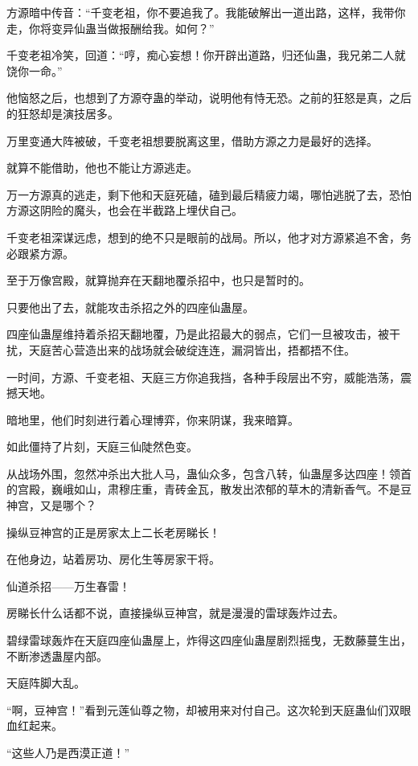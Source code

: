 
\begin{this_body}

方源暗中传音：“千变老祖，你不要追我了。我能破解出一道出路，这样，我带你走，你将变异仙蛊当做报酬给我。如何？”

千变老祖冷笑，回道：“哼，痴心妄想！你开辟出道路，归还仙蛊，我兄弟二人就饶你一命。”

他恼怒之后，也想到了方源夺蛊的举动，说明他有恃无恐。之前的狂怒是真，之后的狂怒却是演技居多。

万里变通大阵被破，千变老祖想要脱离这里，借助方源之力是最好的选择。

就算不能借助，他也不能让方源逃走。

万一方源真的逃走，剩下他和天庭死磕，磕到最后精疲力竭，哪怕逃脱了去，恐怕方源这阴险的魔头，也会在半截路上埋伏自己。

千变老祖深谋远虑，想到的绝不只是眼前的战局。所以，他才对方源紧追不舍，务必跟紧方源。

至于万像宫殿，就算抛弃在天翻地覆杀招中，也只是暂时的。

只要他出了去，就能攻击杀招之外的四座仙蛊屋。

四座仙蛊屋维持着杀招天翻地覆，乃是此招最大的弱点，它们一旦被攻击，被干扰，天庭苦心营造出来的战场就会破绽连连，漏洞皆出，捂都捂不住。

一时间，方源、千变老祖、天庭三方你追我挡，各种手段层出不穷，威能浩荡，震撼天地。

暗地里，他们时刻进行着心理博弈，你来阴谋，我来暗算。

如此僵持了片刻，天庭三仙陡然色变。

从战场外围，忽然冲杀出大批人马，蛊仙众多，包含八转，仙蛊屋多达四座！领首的宫殿，巍峨如山，肃穆庄重，青砖金瓦，散发出浓郁的草木的清新香气。不是豆神宫，又是哪个？

操纵豆神宫的正是房家太上二长老房睇长！

在他身边，站着房功、房化生等房家干将。

仙道杀招——万生春雷！

房睇长什么话都不说，直接操纵豆神宫，就是漫漫的雷球轰炸过去。

碧绿雷球轰炸在天庭四座仙蛊屋上，炸得这四座仙蛊屋剧烈摇曳，无数藤蔓生出，不断渗透蛊屋内部。

天庭阵脚大乱。

“啊，豆神宫！”看到元莲仙尊之物，却被用来对付自己。这次轮到天庭蛊仙们双眼血红起来。

“这些人乃是西漠正道！”


\end{this_body}
